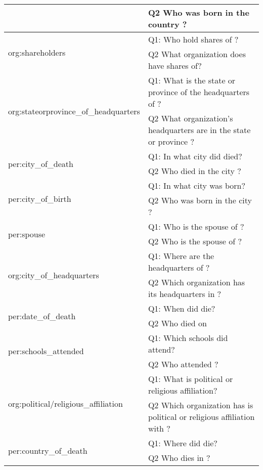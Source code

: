 \documentclass[11pt]{article}
\begin{document}
\begin{table*}[]
{\begin{tabular}{|l|l|}
               & Q2 Who was born in the country ?                 \\ \hline
\multirow{2}{*}{ org:shareholders } & Q1:  Who hold shares of ?                 \\
               & Q2 What organization does  have shares of?                 \\ \hline
\multirow{2}{*}{ org:stateorprovince\_of\_headquarters } & Q1:  What is the state or province of the headquarters of ?                 \\
               & Q2 What organization's headquarters are in the state or province ?                 \\ \hline
\multirow{2}{*}{ per:city\_of\_death } & Q1:  In what city did  died?                 \\
               & Q2 Who died in the city ?                 \\ \hline
\multirow{2}{*}{ per:city\_of\_birth } & Q1:  In what city was  born?                 \\
               & Q2 Who was born in the city ?                 \\ \hline
\multirow{2}{*}{ per:spouse } & Q1:  Who is the spouse of ?                 \\
               & Q2 Who is the spouse of ?                 \\ \hline
\multirow{2}{*}{ org:city\_of\_headquarters } & Q1:  Where are the headquarters of ?                 \\
               & Q2 Which organization has its headquarters in ?                 \\ \hline
\multirow{2}{*}{ per:date\_of\_death } & Q1:  When did  die?                 \\
               & Q2 Who died on                  \\ \hline
\multirow{2}{*}{ per:schools\_attended } & Q1:  Which schools did  attend?                 \\
               & Q2 Who attended ?                 \\ \hline
\multirow{2}{*}{ org:political/religious\_affiliation } & Q1:  What is  political or religious affiliation?                 \\
               & Q2 Which organization has is political or religious affiliation with ?                 \\ \hline
\multirow{2}{*}{ per:country\_of\_death } & Q1:  Where did  die?                 \\
               & Q2 Who dies in ?                 \\ \hline

\end{tabular}}
\end{table*}
\end{document}
